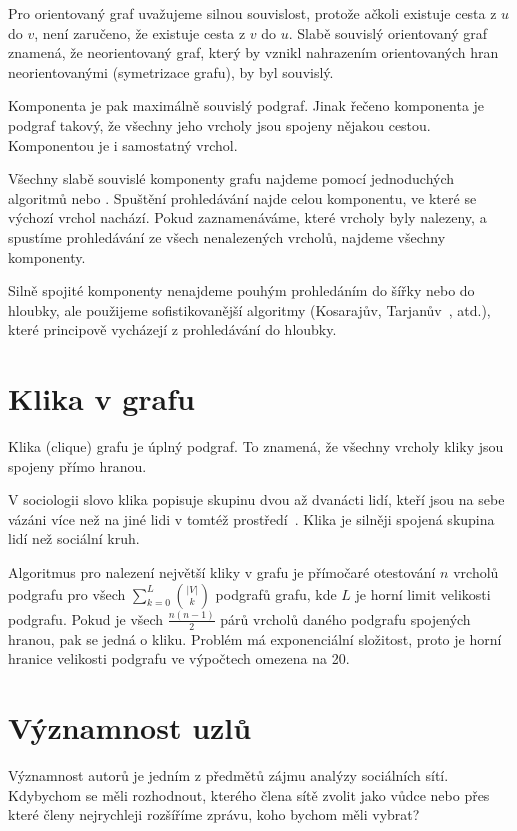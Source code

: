 \documentclass{bakalarka}
\begin{document}
Pro orientovaný graf uvažujeme silnou souvislost, protože ačkoli existuje
cesta z $u$ do $v$, není zaručeno, že existuje cesta z $v$ do $u$.  Slabě
souvislý orientovaný graf znamená, že neorientovaný graf, který by vznikl
nahrazením orientovaných hran neorientovanými (symetrizace grafu), by byl
souvislý.

Komponenta je pak maximálně souvislý podgraf. Jinak řečeno komponenta je
podgraf takový, že všechny jeho vrcholy jsou spojeny nějakou cestou.
Komponentou je i samostatný vrchol.


Všechny slabě souvislé komponenty grafu najdeme pomocí jednoduchých algoritmů
 nebo . Spuštění prohledávání najde
celou komponentu, ve které se výchozí vrchol nachází. Pokud zaznamenáváme,
které vrcholy byly nalezeny, a spustíme prohledávání ze všech nenalezených
vrcholů, najdeme všechny komponenty. 

Silně spojité komponenty nenajdeme pouhým prohledáním do šířky nebo do hloubky,
ale použijeme sofistikovanější algoritmy (Kosarajův,
Tarjanův~\citep{tarjan1972}, atd.), které principově vycházejí z prohledávání
do hloubky.

\section{Klika v grafu}
Klika (clique) grafu je úplný podgraf. To znamená, že všechny vrcholy kliky
jsou spojeny přímo hranou.

V sociologii slovo klika popisuje skupinu dvou až dvanácti lidí, kteří jsou na
sebe vázáni více než na jiné lidi v tomtéž prostředí~\citep{salkind2008}. Klika
je silněji spojená skupina lidí než sociální kruh.

Algoritmus pro nalezení největší kliky v grafu je přímočaré otestování $n$
vrcholů podgrafu pro všech $\sum_{k = 0}^L {|V| \choose k}$ podgrafů grafu,
kde $L$ je horní limit velikosti podgrafu. Pokud je všech $\frac{n(n - 1)}{2}$
párů vrcholů daného podgrafu spojených hranou, pak se jedná o kliku. Problém má
exponenciální složitost, proto je horní hranice velikosti podgrafu ve výpočtech
omezena na 20.

\section{Významnost uzlů}
Významnost autorů je jedním z předmětů zájmu analýzy sociálních sítí. Kdybychom
se měli rozhodnout, kterého člena sítě zvolit jako vůdce nebo přes které členy
nejrychleji rozšíříme zprávu, koho bychom měli vybrat? 
\end{document}
